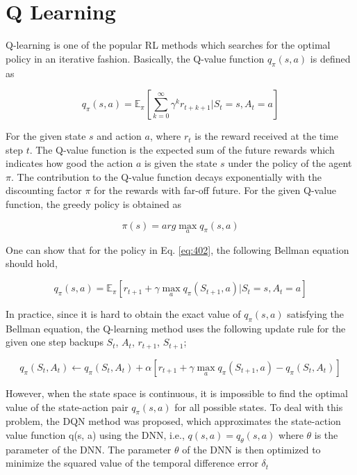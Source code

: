 \section{Q Learning}

Q-learning is one of the popular RL methods which searches for the optimal policy in an iterative fashion. Basically, the Q-value function $q_{\pi} (s, a)$ is defined as

\begin{equation}
q_\pi(s,a) = \mathbb{E}_\pi \left[ \sum _{k=0}^{\infty} \gamma ^k r_{t+k+1} | S_t = s, A_t = a \right]
\end{equation}

For the given state $s$ and action $a$, where $r_t$ is the reward received at the time step $t$. The Q-value function is the expected sum of the future rewards which indicates how good the action $a$ is given the state $s$ under the policy of the agent $\pi$. The contribution to the Q-value function decays exponentially with the discounting factor $\pi$ for the rewards with far-off future. For the given Q-value function, the greedy policy is obtained as

\begin{equation} \label{eq:402}
\pi(s) = arg \max_a q_{\pi} (s, a) 
\end{equation}

One can show that for the policy in Eq. \ref{eq:402}, the following Bellman equation should hold,

\begin{equation}
q_\pi(s,a) = \mathbb{E}_\pi [r_{t+1} + \gamma \max_a q_\pi(S_{t+1},a) | S_t = s, A_t = a]
\end{equation}

In practice, since it is hard to obtain the exact value of $q_{\pi}(s, a)$ satisfying the Bellman equation, the Q-learning method uses the following update rule for the given one step backups $S_t$, $A_t$, $r_{t+1}$, $S_{t+1}$;

\begin{equation}
q_\pi(S_t,A_t) \gets q_\pi(S_t,A_t) + \alpha \left[r_{t+1} + \gamma \max_a q_\pi(S_{t+1},a) - q_\pi(S_t,A_t)\right]
\end{equation}

However, when the state space is continuous, it is impossible to find the optimal value of the state-action pair $q_{\pi} (s, a)$ for all possible states. To deal with this problem, the DQN method was proposed, which approximates the state-action value function q(s, a) using the DNN, i.e., $q(s, a) = q_\theta(s, a)$ where $\theta$ is the parameter of the DNN. The parameter $\theta$ of the DNN is then optimized to minimize the squared value of the temporal difference error $\delta_t$


